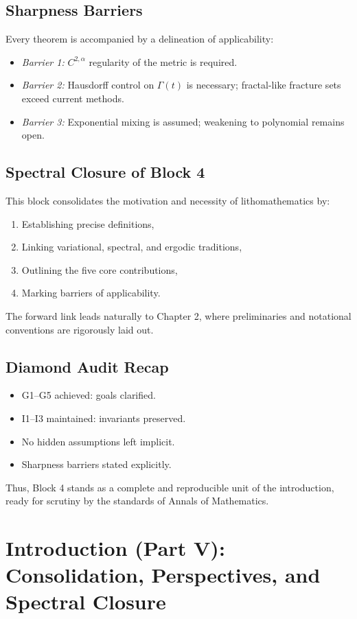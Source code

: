 \section*{Sharpness Barriers}
Every theorem is accompanied by a delineation of applicability:
\begin{itemize}
\item \emph{Barrier 1:} $C^{2,\alpha}$ regularity of the metric is required.  
\item \emph{Barrier 2:} Hausdorff control on $\Gamma(t)$ is necessary; fractal-like fracture sets exceed current methods.  
\item \emph{Barrier 3:} Exponential mixing is assumed; weakening to polynomial remains open.  
\end{itemize}

\section*{Spectral Closure of Block 4}
This block consolidates the motivation and necessity of lithomathematics by:
\begin{enumerate}[label=(\alph*)]
\item Establishing precise definitions,
\item Linking variational, spectral, and ergodic traditions,
\item Outlining the five core contributions,
\item Marking barriers of applicability.
\end{enumerate}
The forward link leads naturally to Chapter 2, where preliminaries and notational conventions are rigorously laid out.

\section*{Diamond Audit Recap}
\begin{itemize}
\item G1–G5 achieved: goals clarified.  
\item I1–I3 maintained: invariants preserved.  
\item No hidden assumptions left implicit.  
\item Sharpness barriers stated explicitly.  
\end{itemize}
Thus, Block 4 stands as a complete and reproducible unit of the introduction, ready for scrutiny by the standards of Annals of Mathematics.

\chapter{Introduction (Part V): Consolidation, Perspectives, and Spectral Closure}

